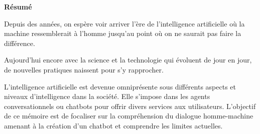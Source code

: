 \thispagestyle{plain}
\normalsize{

\vspace{2em}
\begin{center}
\textbf{\large{Résumé}}
\end{center}

Depuis des années, on espère voir arriver l’ère de l’intelligence artificielle où la machine ressemblerait à l’homme jusqu’au point où on ne saurait pas faire la différence.
\vspace{1em}

Aujourd’hui encore avec la science et la technologie qui évoluent de jour en jour, de nouvelles pratiques naissent pour s’y rapprocher.
\vspace{1em}
	
L’intelligence artificielle est devenue omniprésente sous différents aspects et niveaux d’intelligence dans la société. Elle s’impose dans les agents conversationnels ou chatbots pour offrir divers services aux utilisateurs. L’objectif de ce mémoire est de focaliser sur la compréhension du dialogue homme-machine amenant à la création d’un chatbot et comprendre les limites actuelles.
}